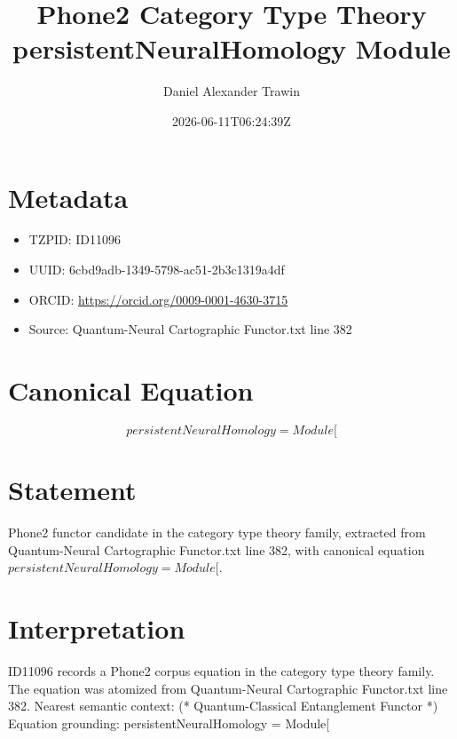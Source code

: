 \documentclass[11pt]{article}
\title{Phone2 Category Type Theory persistentNeuralHomology Module}
\author{Daniel Alexander Trawin}
\date{2026-06-11T06:24:39Z}
\begin{document}
\maketitle
\section*{Metadata}
\begin{itemize}
\item TZPID: ID11096
\item UUID: 6cbd9adb-1349-5798-ac51-2b3c1319a4df
\item ORCID: \url{https://orcid.org/0009-0001-4630-3715}
\item Source: Quantum-Neural Cartographic Functor.txt line 382
\end{itemize}
\section*{Canonical Equation}
\[
persistentNeuralHomology = Module[
\]
\section*{Statement}
Phone2 functor candidate in the category type theory family, extracted from Quantum-Neural Cartographic Functor.txt line 382, with canonical equation $persistentNeuralHomology = Module[$.
\section*{Interpretation}
ID11096 records a Phone2 corpus equation in the category type theory family. The equation was atomized from Quantum-Neural Cartographic Functor.txt line 382. Nearest semantic context: (* Quantum-Classical Entanglement Functor *) Equation grounding: persistentNeuralHomology = Module[
\end{document}
